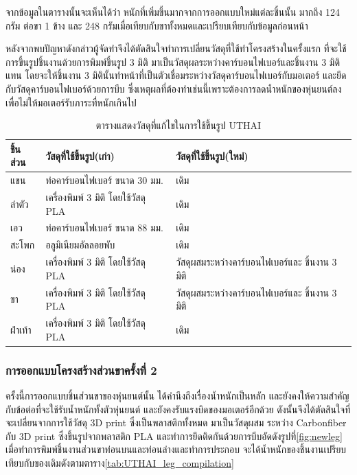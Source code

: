 จากข้อมูลในตารางนั้นจะเห็นได้ว่า หนักที่เพิ่มขึ้นมากจากการออกแบบใหม่แต่ละชิ้นนั้น มากถึง 124 กรัม
ต่อขา 1 ข้าง และ 248 กรัมเมื่อเทียบกับขาทั้งหมดและเปรียบเทียบกับข้อมูลก่อนหน้า

หลังจากพบปัญหาดังกล่าวผู้จัดทำจึงได้ตัดสินใจทำการเปลี่ยนวัสดุที่ใช้ทำโครงสร้างในครั้งแรก
ที่จะใช้การขึ้นรูปชิ้นงานด้วยการพิมพ์ขึ้นรูป 3 มิติ มาเป็นวัสดุผลระหว่างคาร์บอนไฟเบอร์และชิ้นงาน 3 มิติแทน
โดยจะให้ชิ้นงาน 3 มิตินั้นทำหน้าที่เป็นตัวเชื่อมระหว่างวัสดุคาร์บอนไฟเบอร์กับมอเตอร์ และยึดกับวัสดุคาร์บอนไฟเบอร์ด้วยการบีบ
ซึ่งเหตุผลที่ต้องทำเช่นนี้เพราะต้องการลดน้ำหนักของหุ่นยนต์ลง เพื่อไม่ให้มอเตอร์รับภาระที่หนักเกินไป 

\begin{table}[ht]
	\centering
	\begin{tabular}{| l | l | l |}
		\hline
		ชิ้นส่วน & วัสดุที่ใช้ขึ้นรูป(เก่า) & วัสดุที่ใช้ขึ้นรูป(ใหม่) \\
        \hline
        แขน	& ท่อคาร์บอนไฟเบอร์ ขนาด 30 มม. & เดิม\\
        ลำตัว & เครื่องพิมพ์ 3 มิติ โดยใช้วัสดุ PLA & เดิม\\
        เอว	& ท่อคาร์บอนไฟเบอร์ ขนาด 88 มม. & เดิม\\
        สะโพก & อลูมิเนียมอัลลอยพับ & เดิม\\
        น่อง & เครื่องพิมพ์ 3 มิติ โดยใช้วัสดุ PLA & วัสดุผสมระหว่างคาร์บอนไฟเบอร์และ ชิ้นงาน 3 มิติ \\
        ขา & เครื่องพิมพ์ 3 มิติ โดยใช้วัสดุ PLA  & วัสดุผสมระหว่างคาร์บอนไฟเบอร์และ ชิ้นงาน 3 มิติ\\
        ฝ่าเท้า	& เครื่องพิมพ์ 3 มิติ โดยใช้วัสดุ PLA & เดิม\\
	    \hline
	\end{tabular}
	\caption{ตารางแสดงวัสดุที่แก้ไขในการใช้ขึ้นรูป UTHAI }
	\label{tab:UTHAI_materialchange}
\end{table}

\clearpage
\subsubsection{การออกแบบโครงสร้างส่วนขาครั้งที่ 2}
ครั้งนี้การออกแบบชิ้นส่วนขาของหุ่นยนต์นั้น ได้คำนึงถึงเรื่องน้ำหนักเป็นหลัก และยังคงให้ความสำคัญกับข้อต่อที่จะใช้รับน้ำหนักทั้งตัวหุ่นยนต์
และยังคงรับแรงบิดของมอเตอร์อีกด้วย ดังนั้นจึงได้ตัดสินใจที่จะเปลี่ยนจากการใช้วัสดุ 3D print  ซึ่งเป็นพลาสติกทั้งหมด มาเป็นวัสดุผสม 
ระหว่าง Carbonfiber กับ 3D print ซึ่งขึ้นรูปจากพลาสติก PLA และทำการยึดติดกันด้วยการบีบอัดดังรูปที่\ref{fig:newleg}
เมื่อทำการพิมพ์ชิ้นงานส่วนขาท่อนบนและท่อนล่างและทำการประกอบ จะได้น้ำหนักของชิ้นงานเปรียบเทียบกับของเดิมดังตามตาราง\ref{tab:UTHAI_leg_compilation}

